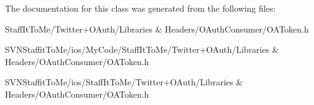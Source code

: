 \-The documentation for this class was generated from the following files\-:\begin{DoxyCompactItemize}
\item 
\-Staff\-It\-To\-Me/\-Twitter+\-O\-Auth/\-Libraries \& Headers/\-O\-Auth\-Consumer/\-O\-A\-Token.\-h\item 
\-S\-V\-N\-Staffit\-To\-Me/ios/\-My\-Code/\-Staff\-It\-To\-Me/\-Twitter+\-O\-Auth/\-Libraries \& Headers/\-O\-Auth\-Consumer/\-O\-A\-Token.\-h\item 
\-S\-V\-N\-Staffit\-To\-Me/ios/\-Staff\-It\-To\-Me/\-Twitter+\-O\-Auth/\-Libraries \& Headers/\-O\-Auth\-Consumer/\-O\-A\-Token.\-h\end{DoxyCompactItemize}
